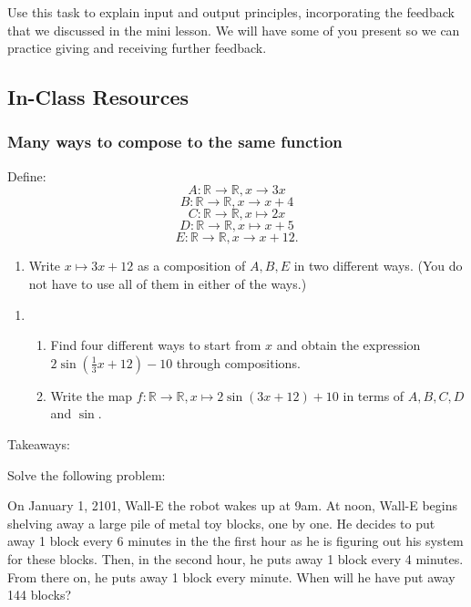 \documentclass[11pt]{article}
\newcommand{\handout}{\subsubsection}
\newenvironment{task}
	{\begin{mdframed}[linecolor=lightgray, linewidth=3pt]\raggedright}
	{\end{mdframed}}
\newcommand{\R}{\mathbb{R}}
\theoremstyle{definition}
\begin{document}
\begin{task}
Use this task to explain input and output principles, incorporating the feedback that we discussed in the mini lesson. We will have some of you present so we can practice giving and receiving further feedback.
\end{task}


\newpage \subsection{In-Class Resources}  
\handout{Many ways to compose to the same function}


Define:
$$A:\R\to \R, x\to 3x$$
$$B:\R\to \R, x\to x+4$$
$$C:\R\to \R,x\mapsto 2x$$
$$D:\R\to \R,x\mapsto x+5$$
$$E:\R\to\R, x\to x+12.$$



\begin{enumerate}
\item Write $x\mapsto 3x+12$ as a composition of $A, B, E$ in two different ways. (You do not have to use all of them in either of the ways.)
\end{enumerate}


\vfill

\begin{enumerate}[resume] 
\item \begin{enumerate}
\item Find four different ways to start from $x$ and obtain the expression $2\sin(\frac{1}{3}x+12)-10$ through compositions.
\item Write the map $f:\R\to\R, x\mapsto 2\sin(3x+12)+10$ in terms of $A, B, C, D$ and $\sin$. 
\end{enumerate}
\end{enumerate}

\vfill 

Takeaways:
\vfill


Solve the following problem:

\begin{mdframed}
On January 1, 2101, Wall-E the robot wakes up at 9am. At noon, Wall-E begins shelving away a large pile of metal toy blocks, one by one. He decides to put away 1 block every 6 minutes in the the first hour as he is figuring out his system for these blocks. Then, in the second hour, he puts away 1 block every 4 minutes. From there on, he puts away 1 block every minute. When will he have put away 144 blocks?
\end{mdframed}
\end{document}
